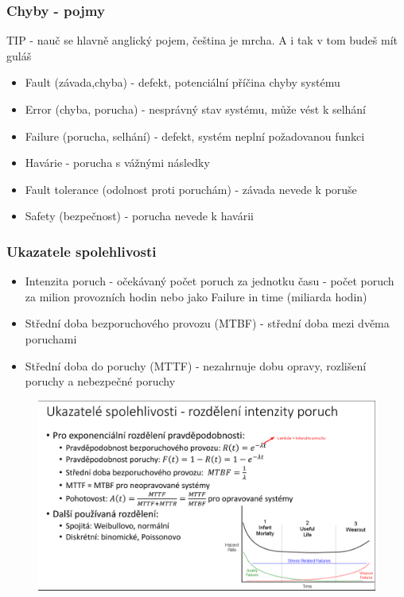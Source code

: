 \subsubsection*{Chyby - pojmy}
TIP - nauč se hlavně anglický pojem, čeština je mrcha. A i tak v tom budeš mít guláš
\begin{itemize}
    \item Fault (závada,chyba) - defekt, potenciální příčina chyby systému
    \item Error (chyba, porucha) - nesprávný stav systému, může vést k selhání
    \item Failure (porucha, selhání) - defekt, systém neplní požadovanou funkci
    \item Havárie - porucha s vážnými následky
    \item Fault tolerance (odolnost proti poruchám) - závada nevede k poruše
    \item Safety (bezpečnost) - porucha nevede k havárii
\end{itemize}

\subsubsection*{Ukazatele spolehlivosti}

\begin{itemize}
    \item Intenzita poruch - očekávaný počet poruch za jednotku času - počet poruch za milion provozních hodin nebo jako Failure in time (miliarda hodin)
    \item Střední doba bezporuchového provozu (MTBF) - střední doba mezi dvěma poruchami
    \item Střední doba do poruchy (MTTF) - nezahrnuje dobu opravy, rozlišení poruchy a nebezpečné poruchy
\end{itemize}

\begin{figure}[h]
    \begin{center}
        \includegraphics[width = \textwidth]{img/Picture23.png}
    \end{center}
\end{figure}

